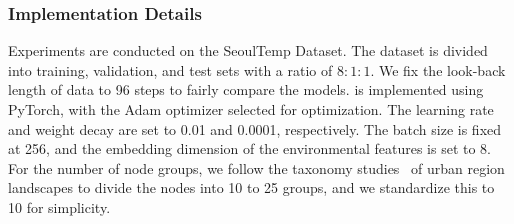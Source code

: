 \subsubsection{Implementation Details}
Experiments are conducted on the SeoulTemp Dataset. The dataset is divided into training, validation, and test sets with a ratio of $8:1:1$. We fix the look-back length of data to 96 steps to fairly compare the models. \model is implemented using PyTorch, with the Adam optimizer selected for optimization. The learning rate and weight decay are set to 0.01 and 0.0001, respectively. The batch size is fixed at 256, and the embedding dimension of the environmental features is set to 8. For the number of node groups, we follow the taxonomy studies~\cite{li2024deep,pauleit2000assessing} of urban region landscapes to divide the nodes into 10 to 25 groups, and we standardize this to 10 for simplicity.

